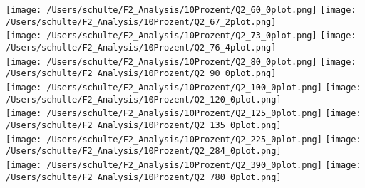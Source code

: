 \texttt{[image: /Users/schulte/F2\_Analysis/10Prozent/Q2\_60\_0plot.png]}
\texttt{[image: /Users/schulte/F2\_Analysis/10Prozent/Q2\_67\_2plot.png]}\\

\texttt{[image: /Users/schulte/F2\_Analysis/10Prozent/Q2\_73\_0plot.png]}
\texttt{[image: /Users/schulte/F2\_Analysis/10Prozent/Q2\_76\_4plot.png]}\\

\texttt{[image: /Users/schulte/F2\_Analysis/10Prozent/Q2\_80\_0plot.png]}
\texttt{[image: /Users/schulte/F2\_Analysis/10Prozent/Q2\_90\_0plot.png]}\\

\texttt{[image: /Users/schulte/F2\_Analysis/10Prozent/Q2\_100\_0plot.png]}
\texttt{[image: /Users/schulte/F2\_Analysis/10Prozent/Q2\_120\_0plot.png]}\\

\texttt{[image: /Users/schulte/F2\_Analysis/10Prozent/Q2\_125\_0plot.png]}
\texttt{[image: /Users/schulte/F2\_Analysis/10Prozent/Q2\_135\_0plot.png]}\\

\texttt{[image: /Users/schulte/F2\_Analysis/10Prozent/Q2\_225\_0plot.png]}
\texttt{[image: /Users/schulte/F2\_Analysis/10Prozent/Q2\_284\_0plot.png]}\\

\texttt{[image: /Users/schulte/F2\_Analysis/10Prozent/Q2\_390\_0plot.png]}
\texttt{[image: /Users/schulte/F2\_Analysis/10Prozent/Q2\_780\_0plot.png]}